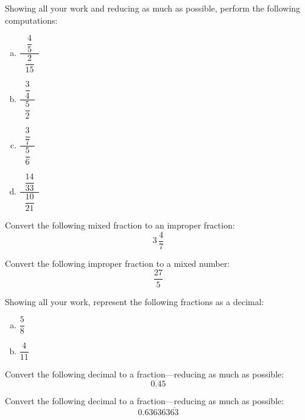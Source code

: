 \documentclass[11pt,letterpaper]{article}
\begin{document}
 Showing all your work and reducing as much as possible, perform the following computations: 
	\begin{enumerate}[(a)]
	\item $\dfrac{\;\;\dfrac{4}{5}\;\;}{\;\;\dfrac{2}{15}\;\;}$
	\item $\dfrac{\;\;\dfrac{3}{4}\;\;}{\;\;\dfrac{5}{2}\;\;}$
	\item $\dfrac{\;\;\dfrac{3}{7}\;\;}{\;\;\dfrac{5}{6}\;\;}$
	\item $\dfrac{\;\;\dfrac{14}{33}\;\;}{\;\;\dfrac{10}{21}\;\;}$
	\end{enumerate}



\newpage



 Convert the following mixed fraction to an improper fraction:
	\[
	3\,\frac{4}{7}
	\]



\newpage



 Convert the following improper fraction to a mixed number:
	\[
	\dfrac{27}{5}
	\]



\newpage



 Showing all your work, represent the following fractions as a decimal:
	\begin{enumerate}[(a)]
	\item $\dfrac{5}{8}$
	\item $\dfrac{4}{11}$
	\end{enumerate}



\newpage



 Convert the following decimal to a fraction---reducing as much as possible:
	\[
	0.45
	\]



\newpage



 Convert the following decimal to a fraction---reducing as much as possible:
	\[
	0.636363\overline{63}
	\]
\end{document}
